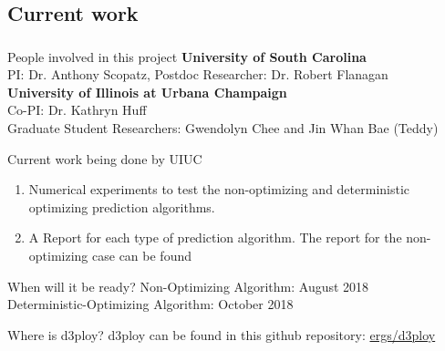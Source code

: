 \subsection{Current work}
\begin{frame}
\frametitle{}

\begin{block}{People involved in this project}
	\textbf{University of South Carolina}\\
	PI: Dr. Anthony Scopatz,  Postdoc Researcher: Dr. Robert Flanagan \\
	\textbf{University of Illinois at Urbana Champaign} \\
	Co-PI: Dr. Kathryn Huff \\
	Graduate Student Researchers: Gwendolyn Chee and Jin Whan Bae (Teddy)
\end{block}

\begin{block}{Current work being done by UIUC}
	\begin{enumerate}
		\item Numerical experiments to test the non-optimizing and deterministic optimizing prediction algorithms. 
		\item A Report for each type of prediction algorithm. The report for the non-optimizing case can be found \cite{bae_numerical_2018}
	\end{enumerate}
\end{block}

\begin{block}{When will it be ready? }
	Non-Optimizing Algorithm: August 2018	\\
	Deterministic-Optimizing Algorithm: October 2018	
\end{block}

\begin{block}{Where is d3ploy?}
	d3ploy can be found in this github repository: \href{https://github.com/ergs/d3ploy}{ergs/d3ploy} 
\end{block}


\end{frame}

